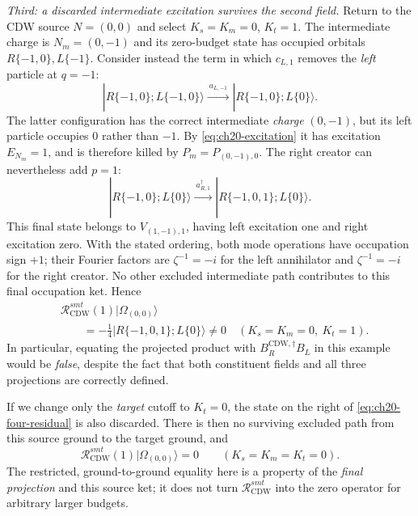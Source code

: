 \begin{example}
\emph{Third: a discarded intermediate excitation survives the
second field.}
Return to the CDW source \(N=(0,0)\) and select
\(K_s=K_m=0\), \(K_t=1\).  The intermediate charge is
\(N_m=(0,-1)\) and its zero-budget state has occupied orbitals
\(R\{-1,0\},L\{-1\}\).  Consider instead the term in which
\(c_{L,1}\) removes the \emph{left} particle at \(q=-1\):
\[
 |R\{-1,0\};L\{-1,0\}\rangle
 \xrightarrow{\ a_{L,-1}\ }
 |R\{-1,0\};L\{0\}\rangle.
\]
The latter configuration has the correct intermediate \emph{charge}
\((0,-1)\), but its left particle occupies \(0\) rather than \(-1\).
By \eqref{eq:ch20-excitation} it has excitation \(E_{N_m}=1\), and
is therefore killed by \(P_m=P_{(0,-1),0}\).  The right creator can
nevertheless add \(p=1\):
\[
 |R\{-1,0\};L\{0\}\rangle
 \xrightarrow{\ a_{R,1}^{\dagger}\ }
 |R\{-1,0,1\};L\{0\}\rangle.
\]
This final state belongs to \(V_{(1,-1),1}\), having left excitation
one and right excitation zero.  With the stated ordering, both mode
operations have occupation sign \(+1\); their Fourier factors are
\(\zeta^{-1}=-i\) for the left annihilator and
\(\zeta^{-1}=-i\) for the right creator.  No other excluded
intermediate path contributes to this final occupation ket.  Hence
\begin{equation}
 \begin{aligned}
 &\mathcal R_{\mathrm{CDW}}^{smt}(1)
                |\Omega_{(0,0)}\rangle\\
 &\qquad=-\frac14
      |R\{-1,0,1\};L\{0\}\rangle\ne0
       \quad (K_s=K_m=0,\ K_t=1).
 \end{aligned}
 \label{eq:ch20-four-residual}
\end{equation}
In particular, equating the projected product with
\(B_R^{\mathrm{CDW},\dagger}B_L\) in this example would
be \emph{false}, despite the fact that both constituent fields and
all three projections are correctly defined.

If we change only the \emph{target} cutoff to \(K_t=0\), the state
on the right of \eqref{eq:ch20-four-residual} is also discarded.
There is then no surviving excluded path from this source ground to
the target ground, and
\begin{equation}
 \mathcal R_{\mathrm{CDW}}^{smt}(1)
      |\Omega_{(0,0)}\rangle=0
 \qquad(K_s=K_m=K_t=0).
 \label{eq:ch20-four-residual-zero}
\end{equation}
The restricted, ground-to-ground equality here is a property of the
\emph{final projection} and this source ket; it does not turn
\(\mathcal R_{\mathrm{CDW}}^{smt}\) into the zero operator for
arbitrary larger budgets.
\end{example}

